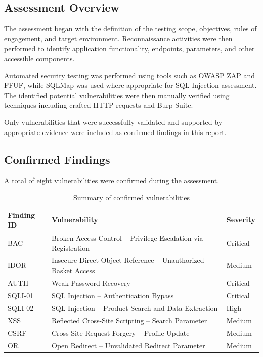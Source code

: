 \subsection*{Assessment Overview}

The assessment began with the definition of the testing scope,
objectives, rules of engagement, and target environment. Reconnaissance
activities were then performed to identify application functionality,
endpoints, parameters, and other accessible components.

Automated security testing was performed using tools such as OWASP
ZAP and FFUF, while SQLMap was used where appropriate for SQL
Injection assessment. The identified potential vulnerabilities were
then manually verified using techniques including crafted HTTP
requests and Burp Suite.

Only vulnerabilities that were successfully validated and supported
by appropriate evidence were included as confirmed findings in this
report.

\subsection*{Confirmed Findings}

A total of eight vulnerabilities were confirmed during the
assessment.

\begin{table}[H]
\centering
\renewcommand{\arraystretch}{1.25}
\begin{tabular}{|l|p{6cm}|l|}
\hline
\textbf{Finding ID} & \textbf{Vulnerability} & \textbf{Severity} \\
\hline
BAC & Broken Access Control -- Privilege Escalation via Registration
& Critical \\
\hline
IDOR & Insecure Direct Object Reference -- Unauthorized Basket Access
& Medium \\
\hline
AUTH & Weak Password Recovery & Critical \\
\hline
SQLI-01 & SQL Injection -- Authentication Bypass & Critical \\
\hline
SQLI-02 & SQL Injection -- Product Search and Data Extraction
& High \\
\hline
XSS & Reflected Cross-Site Scripting -- Search Parameter & Medium \\
\hline
CSRF & Cross-Site Request Forgery -- Profile Update & Medium \\
\hline
OR & Open Redirect -- Unvalidated Redirect Parameter & Medium \\
\hline
\end{tabular}
\caption{Summary of confirmed vulnerabilities}
\end{table}

